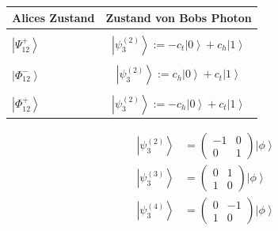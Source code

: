 \begin{refsection}
\begin{center}
   \begin{tabular}{| l | c |}
   \hline
   Alices Zustand & Zustand von Bobs Photon \\
    \hline \\[8pt]
     $\left| \Psi_{12}^{+} \right\rangle$ & $ \left| \psi_{3}^{(2)} \right\rangle := -c_{t} \left| 0 \right \rangle + c_{h} \left| 1 \right \rangle $ \\[8pt] \hline \\[8pt]
     $\left| \Phi_{12}^{-} \right\rangle$ & $ \left| \psi_{3}^{(2)} \right\rangle := c_{h} \left| 0 \right \rangle + c_{t} \left| 1 \right \rangle $ \\[8pt] \hline \\[8pt]
     $\left| \Phi_{12}^{+} \right\rangle$ & $ \left| \psi_{3}^{(2)} \right\rangle := -c_{h} \left| 0 \right \rangle + c_{t} \left| 1 \right \rangle $  \\[8pt] \hline
          
    \end{tabular}
\end{center}

\begin{align}
	\left| \psi_{3}^{(2)} \right \rangle & = \begin{pmatrix} -1 & 0 \\ 0 & 1 \end{pmatrix} \left| \phi \right \rangle \\
	\left| \psi_{3}^{(3)} \right \rangle & = \begin{pmatrix} 0 & 1 \\ 1 & 0 \end{pmatrix} \left| \phi \right \rangle \\
	\left| \psi_{3}^{(4)} \right \rangle & = \begin{pmatrix} 0 & -1 \\ 1 & 0 \end{pmatrix} \left| \phi \right \rangle
\end{align}


\end{refsection}
